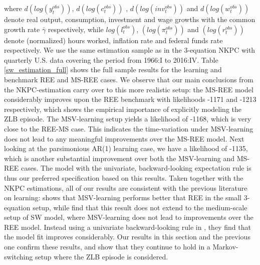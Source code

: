 \documentclass[12pt,reqno]{article}
\numberwithin{equation}{section}
\begin{document}
where $ d( log(y^{obs}_t)) $, $ d(log(c^{obs}_t)) $ , $ d(log({inv}^{obs}_t)) $ and $d(log(w^{obs}_t)) $ denote real output, consumption, investment and wage growths with the common growth rate $\bar{\gamma}$ respectively, while $log(l^{obs}_t)$, $(log(\pi^{obs}_t)) $ and $(log(r^{obs}_t)) $ denote (normalized) hours worked, inflation rate and federal funds rate respectively. We use the same estimation sample as in the 3-equation NKPC with quarterly U.S. data covering the period from 1966:I to 2016:IV. 
Table \ref{sw_estimation_full} shows the full sample results for the learning and benchmark REE and MS-REE cases. We observe that our main conclusions from the NKPC-estimation carry over to this more realistic setup: the MS-REE model considerably improves upon the REE benchmark with likelihoods -1171 and -1213 respectively, which shows the empirical importance of explicitly modeling the ZLB episode. The MSV-learning setup yields a likelihood of -1168, which is very close to the REE-MS case. This indicates the time-variation under MSV-learning does not lead to any meaningful improvements over the MS-REE model. Next looking at the parsimonious AR(1) learning case, we have a likelihood of -1135, which is another substantial improvement over both the MSV-learning and MS-REE cases. The model with the univariate, backward-looking expectation rule is thus our preferred specification based on this results. Taken together with the NKPC estimations, all of our results are consistent with the previous literature on learning: \cite{milani2007expectations} shows that MSV-learning performs better that REE in the small 3-equation setup, while \cite{slobodyan2012alearning} find that this result does not extend to the medium-scale setup of SW model, where MSV-learning does not lead to improvements over the REE model. Instead using a univariate backward-looking rule in \cite{slobodyan2012blearning}, they find that the model fit improves considerably. Our results in this section and the previous one confirm these results, and show that they continue to hold in a Markov-switching setup where the ZLB episode is considered. \\
\noindent
\end{document}
